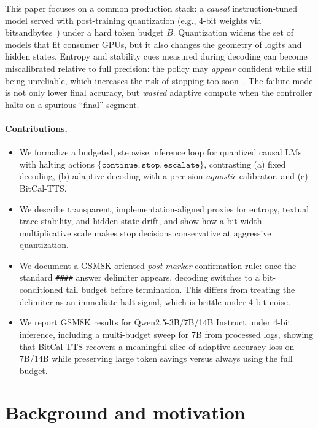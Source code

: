 \documentclass[11pt]{article}
\begin{document}
This paper focuses on a common production stack: a \emph{causal} instruction-tuned model served with post-training quantization (e.g., 4-bit weights via bitsandbytes~\cite{bitsandbytes,dettmers2023qlora}) under a hard token budget $B$. Quantization widens the set of models that fit consumer GPUs, but it also changes the geometry of logits and hidden states. Entropy and stability cues measured during decoding can become miscalibrated relative to full precision: the policy may \emph{appear} confident while still being unreliable, which increases the risk of stopping too soon~\cite{kadavath2022know,manakul2023selfcheckgpt}. The failure mode is not only lower final accuracy, but \emph{wasted} adaptive compute when the controller halts on a spurious ``final'' segment.

\paragraph{Contributions.}
\begin{itemize}
  \item We formalize a budgeted, stepwise inference loop for quantized causal LMs with halting actions $\{\texttt{continue},\texttt{stop},\texttt{escalate}\}$, contrasting (a) fixed decoding, (b) adaptive decoding with a precision-\emph{agnostic} calibrator, and (c) BitCal-TTS.
  \item We describe transparent, implementation-aligned proxies for entropy, textual trace stability, and hidden-state drift, and show how a bit-width multiplicative scale makes stop decisions conservative at aggressive quantization.
  \item We document a GSM8K-oriented \emph{post-marker} confirmation rule: once the standard \texttt{\#\#\#\#} answer delimiter appears, decoding switches to a bit-conditioned tail budget before termination. This differs from treating the delimiter as an immediate halt signal, which is brittle under 4-bit noise.
  \item We report GSM8K results for Qwen2.5-3B/7B/14B Instruct under 4-bit inference, including a multi-budget sweep for 7B from processed logs, showing that BitCal-TTS recovers a meaningful slice of adaptive accuracy loss on 7B/14B while preserving large token savings versus always using the full budget.
\end{itemize}

\section{Background and motivation}
\end{document}
